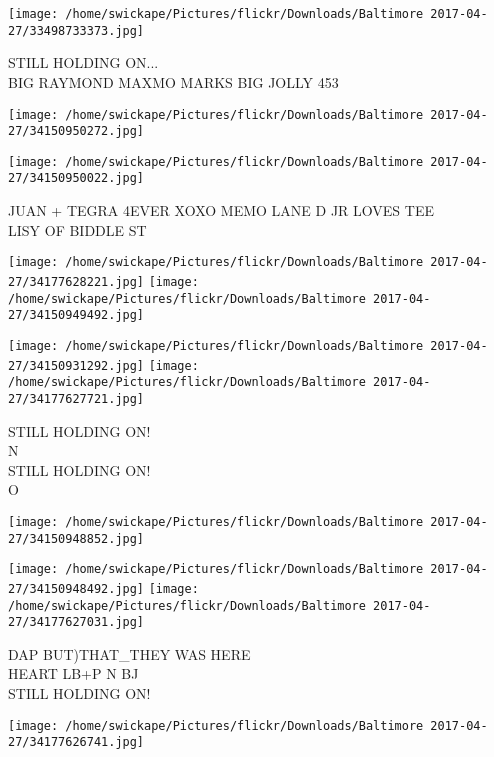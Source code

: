 \documentclass[10pt,letterpaper]{article}
\begin{document}
\vspace{0.25in}
\texttt{[image: /home/swickape/Pictures/flickr/Downloads/Baltimore 2017-04-27/33498733373.jpg]}

STILL HOLDING ON...\\
BIG RAYMOND MAXMO MARKS BIG JOLLY 453\\
\pagebreak

\texttt{[image: /home/swickape/Pictures/flickr/Downloads/Baltimore 2017-04-27/34150950272.jpg]}

\vspace{0.25in}
\texttt{[image: /home/swickape/Pictures/flickr/Downloads/Baltimore 2017-04-27/34150950022.jpg]}

JUAN + TEGRA 4EVER XOXO MEMO LANE D JR LOVES TEE\\
LISY OF BIDDLE ST\\
\pagebreak

\texttt{[image: /home/swickape/Pictures/flickr/Downloads/Baltimore 2017-04-27/34177628221.jpg]}
\texttt{[image: /home/swickape/Pictures/flickr/Downloads/Baltimore 2017-04-27/34150949492.jpg]}

\texttt{[image: /home/swickape/Pictures/flickr/Downloads/Baltimore 2017-04-27/34150931292.jpg]}
\texttt{[image: /home/swickape/Pictures/flickr/Downloads/Baltimore 2017-04-27/34177627721.jpg]}

STILL HOLDING ON!\\
N\\
STILL HOLDING ON!\\
O\\
\pagebreak

\texttt{[image: /home/swickape/Pictures/flickr/Downloads/Baltimore 2017-04-27/34150948852.jpg]}

\vspace{0.25in}
\texttt{[image: /home/swickape/Pictures/flickr/Downloads/Baltimore 2017-04-27/34150948492.jpg]}
\texttt{[image: /home/swickape/Pictures/flickr/Downloads/Baltimore 2017-04-27/34177627031.jpg]}

DAP BUT)THAT\_THEY WAS HERE\\
HEART LB+P N BJ\\
STILL HOLDING ON!\\
\pagebreak

\texttt{[image: /home/swickape/Pictures/flickr/Downloads/Baltimore 2017-04-27/34177626741.jpg]}
\end{document}
